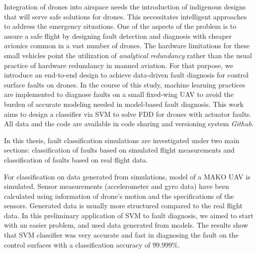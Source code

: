 Integration of drones into airspace needs the introduction of indigenous designs that will serve safe solutions for drones. This necessitates intelligent approaches to address the emergency situations. One of the aspects of the problem is to assure a safe flight by designing fault detection and diagnosis with cheaper avionics common in a vast number of drones.
The hardware limitations for these small vehicles point the utilization of \emph{analytical redundancy} rather than the usual practice of hardware redundancy in manned aviation. 
For that purpose, we introduce an end-to-end design to achieve data-driven fault diagnosis for control surface faults on drones.
In the course of this study, machine learning practices are implemented to diagnose faults on a small fixed-wing UAV to avoid the burden of accurate modeling needed in model-based fault diagnosis. 
This work aims to design a classifier via SVM to solve FDD for drones with actuator faults.
All data and the code are available in code sharing and versioning system \emph{Github}. 

In this thesis, fault classification simulations are investigated under two main sections: classification of faults based on simulated flight measurements and classification of faults based on real flight data. 

For classification on data generated from simulations, model of a MAKO UAV \cite{baskaya2017flight} is simulated.
Sensor measurements (accelerometer and gyro data) have been calculated using information of drone's motion and the specifications of the sensors. 
Generated data is usually more structured compared to the real flight data. 
In this preliminary application of SVM to fault diagnosis, we aimed to start with an easier problem, and used data generated from models.
The results show that SVM classifier was very accurate and fast in diagnosing the fault on the control surfaces with a classification accuracy of $99.999\%$.

